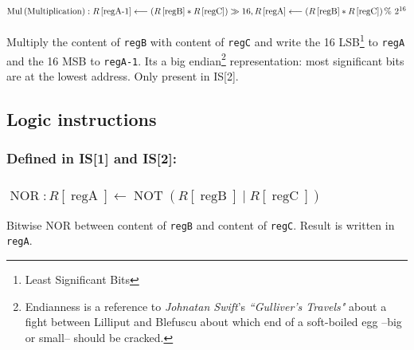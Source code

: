 \documentclass[10pt,a4paper]{article}
\theoremstyle{definition}%
\newcommand{\on}[1]{\operatorname{#1}}
\newcommand{\reg}[1]{\texttt{reg#1}}
\begin{document}
\subsubsection{$\on{Mul} \on{(Multiplication)}: \newline R\left[ \on{regA-1} \right]\longleftarrow \left( R\left[ \on{regB} \right]*R\left[ \on{regC} \right]\right)\gg 16, \newline   R\left[ \on{regA} \right] \longleftarrow \left( R\left[ \on{regB} \right] *  R\left[ \on{regC} \right]\right) \% ~2^{16} $}
Multiply the content of \reg{B} with content of \reg{C} and write the 16 LSB\footnote{Least Significant Bits} to \reg{A} and the 16 MSB to \reg{A-1}. Its a big endian\footnote{Endianness is a reference to\textit{ Johnatan Swift}'s \textit{``Gulliver's Travels"} about a fight between Lilliput and Blefuscu about which end of a soft-boiled egg --big or small-- should be cracked.} representation: most significant bits are at the lowest address.
Only present in IS[2].


\subsection{Logic instructions}
\subsubsection*{ Defined in IS[1] and IS[2]:}
\subsubsection{$\on{NOR}: R\left[ \on{regA} \right] \longleftarrow   \on{NOT}\left( R\left[ \on{regB} \right] \mid R\left[ \on{regC} \right]\right) $}
Bitwise NOR between content of \reg{B} and content of \reg{C}. Result is written in \reg{A}.
\end{document}
